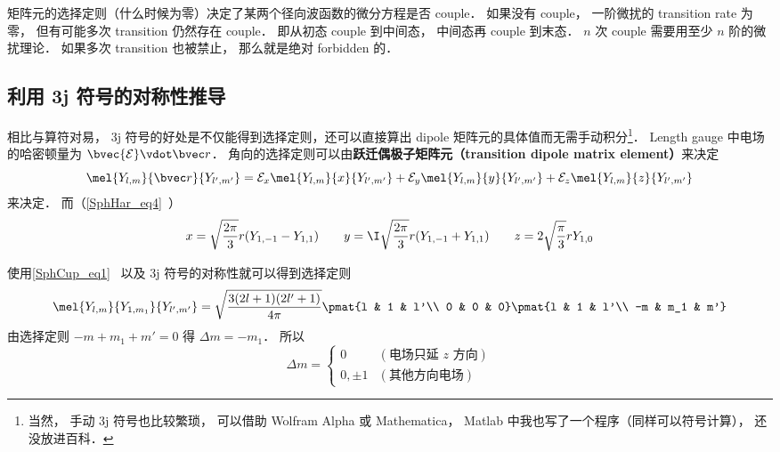 
\begin{issues}
\issueAbstract
\end{issues}


矩阵元的选择定则（什么时候为零）决定了某两个径向波函数的微分方程是否 couple． 如果没有 couple， 一阶微扰的 transition rate 为零， 但有可能多次 transition 仍然存在 couple． 即从初态 couple 到中间态， 中间态再 couple 到末态． $n$ 次 couple 需要用至少 $n$ 阶的微扰理论． 如果多次 transition 也被禁止， 那么就是绝对 forbidden 的． %

\subsection{利用 3j 符号的对称性推导}
相比与算符对易， 3j 符号的好处是不仅能得到选择定则，还可以直接算出 dipole 矩阵元的具体值而无需手动积分\footnote{当然， 手动 3j 符号也比较繁琐， 可以借助 Wolfram Alpha 或 Mathematica， Matlab 中我也写了一个程序（同样可以符号计算）， 还没放进百科．}． Length gauge 中电场的哈密顿量为 $\bvec{\mathcal{E}}\vdot \bvec r$． 角向的选择定则可以由\textbf{跃迁偶极子矩阵元（transition dipole matrix element）}来决定
\begin{equation}
\mel{Y_{l,m}}{\bvec r}{Y_{l',m'}} = \mathcal{E}_x \mel{Y_{l,m}}{x}{Y_{l',m'}} + \mathcal{E}_y \mel{Y_{l,m}}{y}{Y_{l',m'}} + \mathcal{E}_z \mel{Y_{l,m}}{z}{Y_{l',m'}}
\end{equation}
来决定． 而（\autoref{SphHar_eq4}~）
\begin{equation}
x = \sqrt{\frac{2\pi}{3}} r (Y_{1,-1} - Y_{1,1}) \qquad
y = \I \sqrt{\frac{2\pi}{3}} r (Y_{1,-1}+Y_{1,1}) \qquad
z =2\sqrt{\frac{\pi}{3}} rY_{1,0}
\end{equation}

使用\autoref{SphCup_eq1}~ 以及 3j 符号的对称性就可以得到选择定则
\begin{equation}\label{SelRul_eq1}
\mel{Y_{l,m}}{Y_{1,m_1}}{Y_{l',m'}} = \sqrt{\frac{3(2l+1)(2l'+1)}{4\pi}} \pmat{l & 1 & l'\\ 0 & 0 & 0}\pmat{l & 1 & l'\\ -m & m_1 & m'}
\end{equation}
由选择定则 $-m + m_1 + m' = 0$ 得 $\Delta m = -m_1$． 所以
\begin{equation}
\Delta m =
\begin{cases}
0 & (\text{电场只延 $z$ 方向}) \\
0, \pm 1 & (\text{其他方向电场})
\end{cases}
\end{equation}

